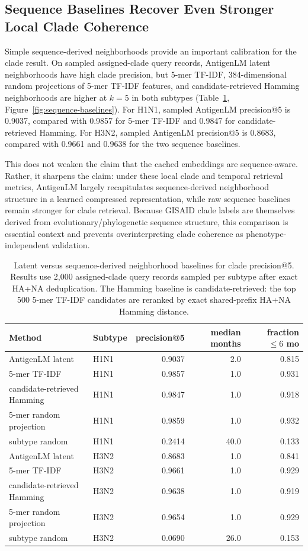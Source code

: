 \documentclass[11pt]{article}
\begin{document}
\subsection{Sequence Baselines Recover Even Stronger Local Clade Coherence}

Simple sequence-derived neighborhoods provide an important calibration for the clade result. On sampled assigned-clade query records, AntigenLM latent neighborhoods have high clade precision, but 5-mer TF-IDF, 384-dimensional random projections of 5-mer TF-IDF features, and candidate-retrieved Hamming neighborhoods are higher at $k=5$ in both subtypes (Table~\ref{tab:sequence-baselines}, Figure~\ref{fig:sequence-baselines}). For H1N1, sampled AntigenLM precision@5 is 0.9037, compared with 0.9857 for 5-mer TF-IDF and 0.9847 for candidate-retrieved Hamming. For H3N2, sampled AntigenLM precision@5 is 0.8683, compared with 0.9661 and 0.9638 for the two sequence baselines.

This does not weaken the claim that the cached embeddings are sequence-aware. Rather, it sharpens the claim: under these local clade and temporal retrieval metrics, AntigenLM largely recapitulates sequence-derived neighborhood structure in a learned compressed representation, while raw sequence baselines remain stronger for clade retrieval. Because GISAID clade labels are themselves derived from evolutionary/phylogenetic sequence structure, this comparison is essential context and prevents overinterpreting clade coherence as phenotype-independent validation.

\begin{table}[H]
\centering
\caption{Latent versus sequence-derived neighborhood baselines for clade precision@5. Results use 2,000 assigned-clade query records sampled per subtype after exact HA+NA deduplication. The Hamming baseline is candidate-retrieved: the top 500 5-mer TF-IDF candidates are reranked by exact shared-prefix HA+NA Hamming distance.}
\label{tab:sequence-baselines}
\begin{tabular}{llrrr}
\toprule
Method & Subtype & precision@5 & median months & fraction $\leq 6$ mo \\
\midrule
AntigenLM latent & H1N1 & 0.9037 & 2.0 & 0.815 \\
5-mer TF-IDF & H1N1 & 0.9857 & 1.0 & 0.931 \\
candidate-retrieved Hamming & H1N1 & 0.9847 & 1.0 & 0.918 \\
5-mer random projection & H1N1 & 0.9859 & 1.0 & 0.932 \\
subtype random & H1N1 & 0.2414 & 40.0 & 0.133 \\
AntigenLM latent & H3N2 & 0.8683 & 1.0 & 0.841 \\
5-mer TF-IDF & H3N2 & 0.9661 & 1.0 & 0.929 \\
candidate-retrieved Hamming & H3N2 & 0.9638 & 1.0 & 0.919 \\
5-mer random projection & H3N2 & 0.9654 & 1.0 & 0.929 \\
subtype random & H3N2 & 0.0690 & 26.0 & 0.153 \\
\bottomrule
\end{tabular}
\end{table}
\end{document}
